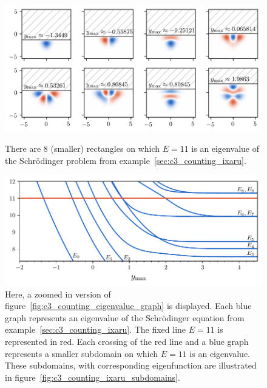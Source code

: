 \begin{figure}
  \begin{center}
    \includegraphics[width=1\textwidth]{img/chapter3/counting/ixaru.png}
  \end{center}
  \caption{There are 8 (smaller) rectangles on which $E = 11$ is an eigenvalue of the Schrödinger problem from example~\ref{sec:c3_counting_ixaru}.}\label{fig:c3_counting_ixaru_subdomains}
  \vspace{1cm}
  \begin{center}
    \includegraphics[width=1\textwidth]{img/chapter3/counting/counting_eigenvalues_zoom.pdf}
  \end{center}
  \caption{Here, a zoomed in version of figure~\ref{fig:c3_counting_eigenvalue_graph} is displayed. Each blue graph represents an eigenvalue of the Schrödinger equation from example~\ref{sec:c3_counting_ixaru}. The fixed line $E = 11$ is represented in red. Each crossing of the red line and a blue graph represents a smaller subdomain on which $E=11$ is an eigenvalue. These subdomains, with corresponding eigenfunction are illustrated in figure~\ref{fig:c3_counting_ixaru_subdomains}.}\label{fig:counting_eigenvalues_zoom}
\end{figure}

